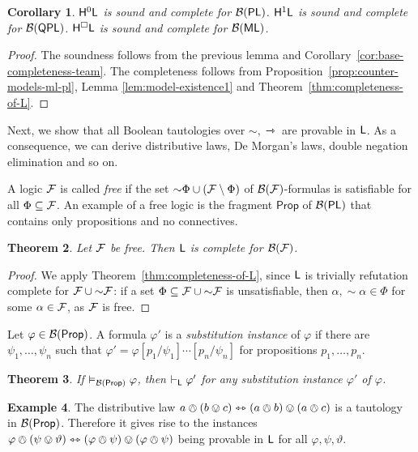 \documentclass[a4paper,english,fleqn,11pt,final]{scrartcl}
\newcommand{\negg}{{\sim}}
\newcommand{\logic}[1]{\ensuremath{\mathsf{#1}}\xspace}
\newcommand{\PS}{\logic{Prop}}
\newcommand{\PL}{\logic{PL}}
\newcommand{\QPL}{\logic{QPL}}
\newcommand{\ML}{\logic{ML}}
\newcommand{\calB}{\protect\ensuremath{\mathcal{B}}}
\newcommand{\calF}{\protect\ensuremath{\mathcal{F}}}
\newcommand{\sfH}{\protect\ensuremath{\mathsf{H}}}
\newcommand{\sfL}{\protect\ensuremath{\mathsf{L}}}
\newcommand{\timp}{\rightarrowtriangle}
\newcommand{\tequiv}{\leftrightarrowtriangle}
\newcommand{\oland}{\owedge}
\theoremstyle{plain}
\newtheorem{theorem}{Theorem}[section]
\newtheorem{corollary}[theorem]{Corollary}
\theoremstyle{definition}
\newtheorem{example}[theorem]{Example}
\begin{document}
\begin{corollary}\label{cor:completeness-bpl-bml}
	$\sfH^0\sfL$ is sound and complete for $\calB(\PL)$.
	$\sfH^1\sfL$ is sound and complete for $\calB(\QPL)$.
	$\sfH^\Box\sfL$ is sound and complete for $\calB(\ML)$.
\end{corollary}
\begin{proof}
The soundness follows from the previous lemma and Corollary~\ref{cor:base-completeness-team}.
The completeness follows from Proposition~\ref{prop:counter-models-ml-pl}, Lemma \ref{lem:model-existence1} and Theorem~\ref{thm:completeness-of-L}.
\end{proof}


Next, we show that all Boolean tautologies over $\negg,\timp$ are provable in $\sfL$.
As a consequence, we can derive distributive laws, De Morgan's laws, double negation elimination and so on.

A logic $\calF$ is called \emph{free} if the set $\negg\Phi \cup (\calF\setminus \Phi)$ of $\calB(\calF)$-formulas is satisfiable for all $\Phi \subseteq \calF$.
An example of a free logic is the fragment $\PS$ of $\calB(\PL)$ that contains only propositions and no connectives.

\begin{theorem}\label{thm:completeness-of-l-2}
Let $\calF$ be free.
Then $\sfL$ is complete for $\calB(\calF)$.
\end{theorem}
\begin{proof}
We apply Theorem~\ref{thm:completeness-of-L}, since $\sfL$ is trivially refutation complete for $\calF \cup \negg \calF$: if a set $\Phi \subseteq \calF \cup\negg\calF$ is unsatisfiable, then $\alpha,\negg\alpha \in \Phi$ for some $\alpha \in \calF$, as $\calF$ is free.
\end{proof}

Let $\varphi \in \calB(\PS)$.
A formula $\varphi'$ is a \emph{substitution instance} of $\varphi$ if there are $\psi_1,\ldots,\psi_n$ such that $\varphi' = \varphi[p_1/\psi_1]\cdots[p_n/\psi_n]$ for propositions $p_1,\ldots,p_n$.

\begin{theorem}\label{thm:completeness-bool}
If $\vDash_{\calB(\PS)} \varphi$, then $\vdash_\sfL \varphi'$ for any substitution instance $\varphi'$ of $\varphi$.
\end{theorem}

\begin{example}
The distributive law $a \oland (b \ovee c) \tequiv (a \oland b) \ovee (a \oland c)$ is a tautology in $\calB(\PS)$.
Therefore it gives rise to the instances $\varphi \oland (\psi \ovee \vartheta) \tequiv (\varphi \oland \psi) \ovee (\varphi \oland \psi)$ being provable in $\sfL$ for all $\varphi,\psi,\vartheta$.
\end{example}
\end{document}
